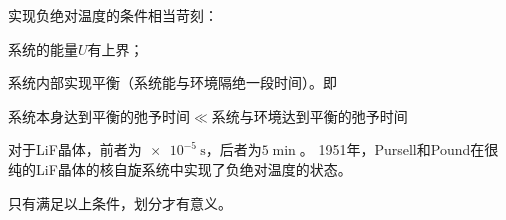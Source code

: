 \begin{remark}
	实现负绝对温度的条件相当苛刻：
	\begin{compactenum}
		\item 系统的能量$U$有上界；
		\item 系统内部实现平衡（系统能与环境隔绝一段时间）。即
		\begin{center}
			系统本身达到平衡的弛予时间$\ll$系统与环境达到平衡的弛予时间
		\end{center}
		对于LiF晶体，前者为$\SI{e-5}\s$，后者为$\SI{5}\min$。
		1951年，Pursell和Pound在很纯的LiF晶体的核自旋系统中实现了负绝对温度的状态。
	\end{compactenum}
	只有满足以上条件，划分才有意义。
\end{remark}

